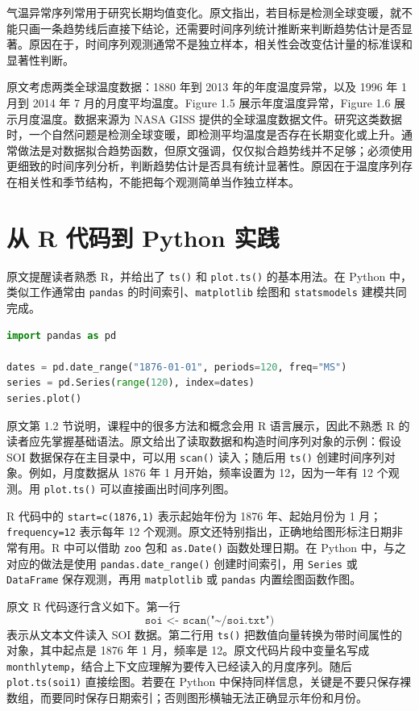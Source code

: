 \documentclass[11pt,a4paper]{ctexart}
\begin{document}
气温异常序列常用于研究长期均值变化。原文指出，若目标是检测全球变暖，就不能只画一条趋势线后直接下结论，还需要时间序列统计推断来判断趋势估计是否显著。原因在于，时间序列观测通常不是独立样本，相关性会改变估计量的标准误和显著性判断。

原文考虑两类全球温度数据：1880 年到 2013 年的年度温度异常，以及 1996 年 1 月到 2014 年 7 月的月度平均温度。Figure 1.5 展示年度温度异常，Figure 1.6 展示月度温度。数据来源为 NASA GISS 提供的全球温度数据文件。研究这类数据时，一个自然问题是检测全球变暖，即检测平均温度是否存在长期变化或上升。通常做法是对数据拟合趋势函数，但原文强调，仅仅拟合趋势线并不足够；必须使用更细致的时间序列分析，判断趋势估计是否具有统计显著性。原因在于温度序列存在相关性和季节结构，不能把每个观测简单当作独立样本。

\section{从 R 代码到 Python 实践}

原文提醒读者熟悉 R，并给出了 \texttt{ts()} 和 \texttt{plot.ts()} 的基本用法。在 Python 中，类似工作通常由 \texttt{pandas} 的时间索引、\texttt{matplotlib} 绘图和 \texttt{statsmodels} 建模共同完成。

\begin{lstlisting}[language=Python, caption={Python 中构造月度时间序列的基本模式}]
import pandas as pd

dates = pd.date_range("1876-01-01", periods=120, freq="MS")
series = pd.Series(range(120), index=dates)
series.plot()
\end{lstlisting}

原文第 1.2 节说明，课程中的很多方法和概念会用 R 语言展示，因此不熟悉 R 的读者应先掌握基础语法。原文给出了读取数据和构造时间序列对象的示例：假设 SOI 数据保存在主目录中，可以用 \texttt{scan()} 读入；随后用 \texttt{ts()} 创建时间序列对象。例如，月度数据从 1876 年 1 月开始，频率设置为 12，因为一年有 12 个观测。用 \texttt{plot.ts()} 可以直接画出时间序列图。

R 代码中的 \texttt{start=c(1876,1)} 表示起始年份为 1876 年、起始月份为 1 月；\texttt{frequency=12} 表示每年 12 个观测。原文还特别指出，正确地给图形标注日期非常有用。R 中可以借助 \texttt{zoo} 包和 \texttt{as.Date()} 函数处理日期。在 Python 中，与之对应的做法是使用 \texttt{pandas.date\_range()} 创建时间索引，用 \texttt{Series} 或 \texttt{DataFrame} 保存观测，再用 \texttt{matplotlib} 或 \texttt{pandas} 内置绘图函数作图。

原文 R 代码逐行含义如下。第一行
\[
  \texttt{soi <- scan("\textasciitilde/soi.txt")}
\]
表示从文本文件读入 SOI 数据。第二行用 \texttt{ts()} 把数值向量转换为带时间属性的对象，其中起点是 1876 年 1 月，频率是 12。原文代码片段中变量名写成 \texttt{monthlytemp}，结合上下文应理解为要传入已经读入的月度序列。随后 \texttt{plot.ts(soi1)} 直接绘图。若要在 Python 中保持同样信息，关键是不要只保存裸数组，而要同时保存日期索引；否则图形横轴无法正确显示年份和月份。
\end{document}

